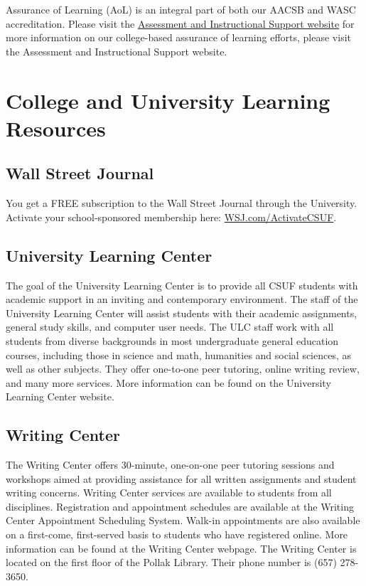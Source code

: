 \documentclass{syllabus}
\begin{document}
Assurance of Learning (AoL) is an integral part of both our AACSB and WASC accreditation. Please visit the \href{https://business.fullerton.edu/assessment}{Assessment and Instructional Support website} for more information on our college-based assurance of learning efforts, please visit the Assessment and Instructional Support website.

\section*{College and University Learning Resources}


\subsection*{Wall Street Journal}
You get a FREE subscription to the Wall Street Journal through the University. Activate your school-sponsored membership here: \href{https://partner.wsj.com/p/1110800011/register?mod=wsj_CSUF_360}{WSJ.com/ActivateCSUF}.


\subsection*{University Learning Center}
The goal of the University Learning Center is to provide all CSUF students with academic support in an inviting and contemporary environment.  The staff of the University Learning Center will assist students with their academic assignments, general study skills, and computer user needs. The ULC staff work with all students from diverse backgrounds in most undergraduate general education courses, including those in science and math, humanities and social sciences, as well as other subjects. They offer one-to-one peer tutoring, online writing review, and many more services.  More information can be found on the University Learning Center website. 

\subsection*{Writing Center}
The Writing Center offers 30-minute, one-on-one peer tutoring sessions and workshops aimed at providing assistance for all written assignments and student writing concerns. Writing Center services are available to students from all disciplines. Registration and appointment schedules are available at the Writing Center Appointment Scheduling System. Walk-in appointments are also available on a first-come, first-served basis to students who have registered online. More information can be found at the  Writing Center webpage.  The Writing Center is located on the first floor of the Pollak Library. Their phone number is (657) 278-3650.
\end{document}
